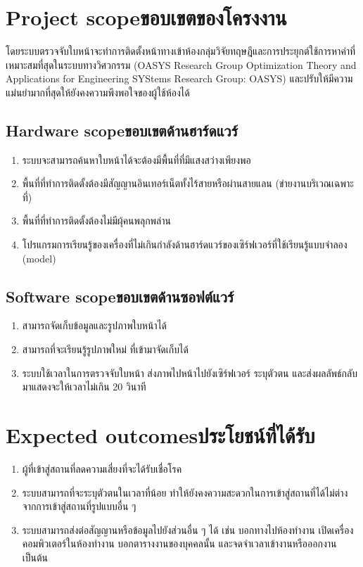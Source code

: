 \section{\ifenglish Project scope\else ขอบเขตของโครงงาน\fi}
โดยระบบตรวจจับใบหน้าจะทำการติดตั้งหน้าทางเข้าห้องกลุ่มวิจัยทฤษฎีและการประยุกต์ใช้การหาค่าที่เหมาะสมที่สุดในระบบทางวิศวกรรม 
(OASYS Research Group Optimization Theory and Applications for Engineering SYStems Research Group: OASYS) 
และปรับให้มีความแม่นยำมากที่สุดให้ยังคงความพึงพอใจของผู้ใช้ห้องได้

\subsection{\ifenglish Hardware scope\else ขอบเขตด้านฮาร์ดแวร์\fi}
\begin{enumerate}
    \item ระบบจะสามารถค้นหาใบหน้าได้จะต้องมีพื้นที่ที่มีแสงสว่างเพียงพอ
    \item พื้นที่ที่ทำการติดตั้งต้องมีสัญญานอินเทอร์เน็ตทั้งไร้สายหรือผ่านสายแลน (ข่ายงานบริเวณเฉพาะที่)
    \item พื้นที่ที่ทำการติดตั้งต้องไม่มีผุ้คนพลุกพล่าน
    \item โปรแกรมการเรียนรู้ของเครื่องที่ไม่เกินกําลังด้านฮาร์ดแวร์ของเซิร์ฟเวอร์ที่ใช้เรียนรู้แบบจำลอง (model)
\end{enumerate}

\subsection{\ifenglish Software scope\else ขอบเขตด้านซอฟต์แวร์\fi}
\begin{enumerate}
    \item สามารถจัดเก็บข้อมูลและรูปภาพใบหน้าได้
    \item สามารถที่จะเรียนรู้รูปภาพใหม่ ที่เข้ามาจัดเก็บได้
    \item ระบบใช้เวลาในการตรวจจับใบหน้า ส่งภาพไปหน้าไปยังเซิร์ฟเวอร์ ระบุตัวตน และส่งผลลัพธ์กลับมาแสดงจะให้เวลาไม่เกิน 20 วินาที
\end{enumerate}

\section{\ifenglish Expected outcomes\else ประโยชน์ที่ได้รับ\fi}
\begin{enumerate}
    \item ผู้ที่เข้าสู่สถานที่ลดความเสี่ยงที่จะได้รับเชื่อโรค
    \item ระบบสามารถที่จะระบุตัวตนในเวลาที่น้อย ทำให้ยังคงความสะดวกในการเข้าสู่สถานที่ได้ไม่ต่างจากการเข้าสู่สถานที่รูปแบบอื่น ๆ
    \item ระบบสามารถส่งต่อสัญญานหรือข้อมูลไปยังส่วนอื่น ๆ ได้ เช่น บอกทางไปห้องทำงาน เปิดเครื่องคอมพิวเตอร์ในห้องทำงาน บอกตารางงานของบุคคลนั้น และจดจำเวลาเข้างานหรือออกงาน เป็นต้น
\end{enumerate}

